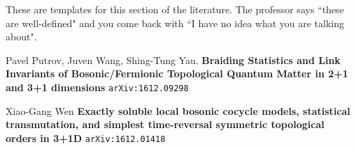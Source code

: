 \documentclass[12pt]{article}
\begin{document}
\newpage

\noindent These are templates for this section of the literature.  The professor says ``these are well-defined" and you come back with ``I have no idea what you are talking about".

\vfill

\selectfont \fontsize{12}{10}\selectfont

\begin{thebibliography}{}



\item Pavel Putrov, Juven Wang, Shing-Tung Yau.  \textbf{Braiding Statistics and Link Invariants of Bosonic/Fermionic Topological Quantum Matter in 2+1 and 3+1 dimensions}
\texttt{arXiv:1612.09298}

\item Xiao-Gang Wen \textbf{Exactly soluble local bosonic cocycle models, statistical transmutation, and simplest time-reversal symmetric topological orders in 3+1D} \texttt{arXiv:1612.01418}

\end{thebibliography}
\end{document}
